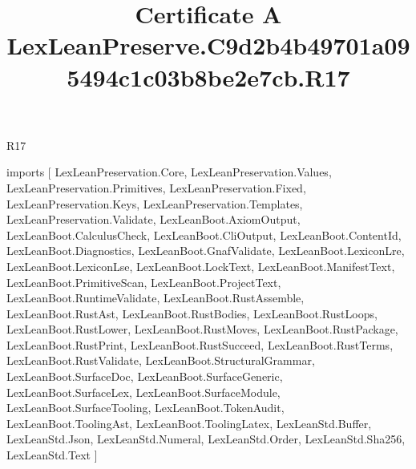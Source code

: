 \begin{lexlean}{R17}
\title{Certificate A LexLeanPreserve.C9d2b4b49701a095494c1c03b8be2e7cb.R17}
\begin{coremodule}
imports [
  LexLeanPreservation.Core,
  LexLeanPreservation.Values,
  LexLeanPreservation.Primitives,
  LexLeanPreservation.Fixed,
  LexLeanPreservation.Keys,
  LexLeanPreservation.Templates,
  LexLeanPreservation.Validate,
  LexLeanBoot.AxiomOutput,
  LexLeanBoot.CalculusCheck,
  LexLeanBoot.CliOutput,
  LexLeanBoot.ContentId,
  LexLeanBoot.Diagnostics,
  LexLeanBoot.GnafValidate,
  LexLeanBoot.LexiconLre,
  LexLeanBoot.LexiconLse,
  LexLeanBoot.LockText,
  LexLeanBoot.ManifestText,
  LexLeanBoot.PrimitiveScan,
  LexLeanBoot.ProjectText,
  LexLeanBoot.RuntimeValidate,
  LexLeanBoot.RustAssemble,
  LexLeanBoot.RustAst,
  LexLeanBoot.RustBodies,
  LexLeanBoot.RustLoops,
  LexLeanBoot.RustLower,
  LexLeanBoot.RustMoves,
  LexLeanBoot.RustPackage,
  LexLeanBoot.RustPrint,
  LexLeanBoot.RustSucceed,
  LexLeanBoot.RustTerms,
  LexLeanBoot.RustValidate,
  LexLeanBoot.StructuralGrammar,
  LexLeanBoot.SurfaceDoc,
  LexLeanBoot.SurfaceGeneric,
  LexLeanBoot.SurfaceLex,
  LexLeanBoot.SurfaceModule,
  LexLeanBoot.SurfaceTooling,
  LexLeanBoot.TokenAudit,
  LexLeanBoot.ToolingAst,
  LexLeanBoot.ToolingLatex,
  LexLeanStd.Buffer,
  LexLeanStd.Json,
  LexLeanStd.Numeral,
  LexLeanStd.Order,
  LexLeanStd.Sha256,
  LexLeanStd.Text
]


\end{coremodule}
\end{lexlean}
